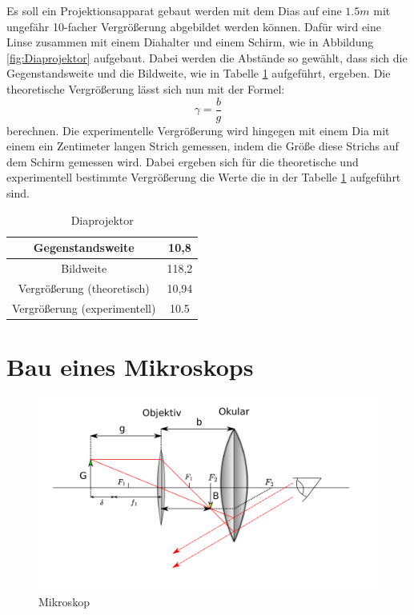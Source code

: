 Es soll ein Projektionsapparat gebaut werden mit dem Dias auf eine $1.5m$ mit ungefähr 10-facher Vergrößerung abgebildet werden können. Dafür wird eine Linse zusammen mit einem Diahalter und einem Schirm, wie in Abbildung \ref{fig:Diaprojektor} aufgebaut. Dabei werden die Abstände so gewählt, dass sich die Gegenstandsweite und die Bildweite, wie in Tabelle \ref{tab:Diaprojektor} aufgeführt, ergeben. Die theoretische Vergrößerung lässt sich nun mit der Formel: $$ \gamma = \frac{b}{g} $$ berechnen. Die experimentelle Vergrößerung wird hingegen mit einem Dia mit einem ein Zentimeter langen Strich gemessen, indem die Größe diese Strichs auf dem Schirm gemessen wird. Dabei ergeben sich für die theoretische und experimentell bestimmte Vergrößerung die Werte die in der Tabelle \ref{tab:Diaprojektor} aufgeführt sind.

\begin{table}[h!]
    \centering
    \begin{tabular}{|c|c|}
	\hline
	Gegenstandsweite & 10,8 \\
	\hline
	Bildweite & 118,2 \\
	\hline
	Vergrößerung (theoretisch) & 10,94 \\
	\hline
	Vergrößerung (experimentell) & 10.5 \\
	\hline
\end{tabular}
    \caption{Diaprojektor}
    \label{tab:Diaprojektor}
\end{table}

\clearpage

\section{Bau eines Mikroskops}

\begin{figure}[h!]
    \centering
    \includegraphics[scale=0.8]{Geometrische_Optik/Protokoll/fig/Mikroskop.png}
    \caption{Mikroskop}
    \label{fig:Mikroskop}
\end{figure}

